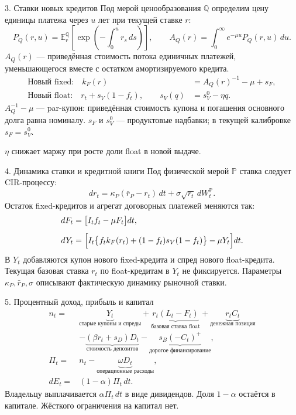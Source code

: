\documentclass[aspectratio=169,11pt]{beamer}
\newcommand{\E}{\mathbb E}
\newcommand{\Pp}{\mathbb P}
\newcommand{\Qq}{\mathbb Q}
\begin{document}
\begin{frame}{3. Ставки новых кредитов}
Под мерой ценообразования $\Qq$ определим цену единицы платежа
через $u$ лет при текущей ставке $r$:
\[
P_Q(r,u)=\E_r^{\Qq}\!\left[
\exp\!\left(-\int_0^u r_s\,ds\right)\right],
\qquad
A_Q(r)=\int_0^\infty e^{-\mu u}P_Q(r,u)\,du.
\]
$A_Q(r)$ --- приведённая стоимость потока единичных платежей,
уменьшающегося вместе с остатком амортизируемого кредита.
\begin{align*}
\text{Новый fixed:}\quad k_F(r)&=A_Q(r)^{-1}-\mu+s_F,\\
\text{Новый float:}\quad r_t+s_V(1-f_t),\qquad
s_V(q)&=s_V^0-\eta q.
\end{align*}
\footnotesize
$A_Q^{-1}-\mu$ --- par-купон: приведённая стоимость купона и погашения
основного долга равна номиналу. $s_F$ и $s_V^0$ --- продуктовые надбавки;
в текущей калибровке $s_F=s_V^0$.

$\eta$ снижает маржу при росте доли float в новой выдаче.
\end{frame}

\begin{frame}{4. Динамика ставки и кредитной книги}
Под физической мерой $\Pp$ ставка следует CIR-процессу:
\[
dr_t=\kappa_P(\bar r_P-r_t)\,dt
+\sigma\sqrt{r_t}\,dW_t^{\Pp}.
\]
Остаток fixed-кредитов и агрегат договорных платежей меняются так:
\begin{align*}
dF_t&=\bigl[I_tf_t-\mu F_t\bigr]dt,\\[0.5em]
dY_t&=\Bigl[I_t
\bigl\{f_tk_F(r_t)+(1-f_t)s_V(1-f_t)\bigr\}
-\mu Y_t\Bigr]dt.
\end{align*}
\footnotesize
В $Y_t$ добавляются купон нового fixed-кредита и спред нового
float-кредита. Текущая базовая ставка $r_t$ по float-кредитам в
$Y_t$ не фиксируется. Параметры $\kappa_P,\bar r_P,\sigma$
описывают фактическую динамику рыночной ставки.
\end{frame}

\begin{frame}{5. Процентный доход, прибыль и капитал}
\small
\begin{align*}
n_t={}&
\underbrace{Y_t}_{\text{старые купоны и спреды}}
+\underbrace{r_t(L_t-F_t)}_{\text{базовая ставка float}}
+\underbrace{r_tC_t}_{\text{денежная позиция}}\\
&-\underbrace{(\beta r_t+s_D)D_t}_{\text{стоимость депозитов}}
-\underbrace{s_B(-C_t)^+}_{\text{дорогое финансирование}},\\[0.4em]
\Pi_t={}&n_t-\underbrace{\omega D_t}_{\text{операционные расходы}},\\[0.4em]
dE_t={}&(1-\alpha)\Pi_t\,dt.
\end{align*}
\medskip
Владельцу выплачивается $\alpha\Pi_t\,dt$ в виде дивидендов. Доля $1-\alpha$ остаётся в капитале.
Жёсткого ограничения на капитал нет.
\end{frame}
\end{document}
